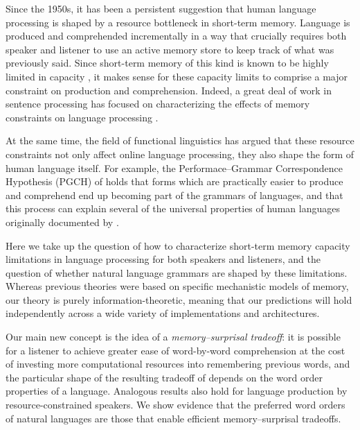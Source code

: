 Since the 1950s, it has been a persistent suggestion that human language processing is shaped by a resource bottleneck in short-term memory.
Language is produced and comprehended incrementally in a way that crucially requires both speaker and listener to use an active memory store to keep track of what was previously said.
Since short-term memory of this kind is known to be highly limited in capacity \citep{miller1956magical}, it makes sense for these capacity limits to comprise a major constraint on production and comprehension.
Indeed, a great deal of work in sentence processing has focused on characterizing the effects of memory constraints on language processing \citep{gibson-linguistic-1998,lewis-activation-based-2005,levy2013memory}.

At the same time, the field of functional linguistics has argued that these resource constraints not only affect online language processing, they also shape the form of human language itself.
For example, the Performace--Grammar Correspondence Hypothesis (PGCH) of \citet{hawkins1994performance} holds that forms which are practically easier to produce and comprehend end up becoming part of the grammars of languages, and that this process can explain several of the universal properties of human languages originally documented by \citet{greenberg-universals-1963}.

Here we take up the question of how to characterize short-term memory capacity limitations in language processing for both speakers and listeners, and the question of whether natural language grammars are shaped by these limitations.
Whereas previous theories were based on specific mechanistic models of memory, our theory is purely information-theoretic, meaning that our predictions will hold independently across a wide variety of implementations and architectures.

Our main new concept is the idea of a \emph{memory--surprisal tradeoff}: it is possible for a listener to achieve greater ease of word-by-word comprehension at the cost of investing more computational resources into remembering previous words, and the particular shape of the resulting tradeoff of depends on the word order properties of a language. Analogous results also hold for language production by resource-constrained speakers. We show evidence that the preferred word orders of natural languages are those that enable efficient memory--surprisal tradeoffs.

